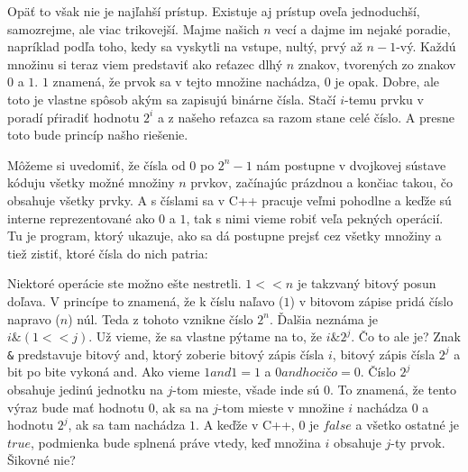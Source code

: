 
Opäť to však nie je najľahší prístup. Existuje aj prístup oveľa jednoduchší, samozrejme, ale viac
trikovejší. Majme našich $n$ vecí a dajme im nejaké poradie, napríklad podľa toho, kedy sa
vyskytli na vstupe, nultý, prvý až $n-1$-vý. Každú množinu si teraz viem predstaviť ako reťazec dlhý
$n$ znakov, tvorených zo znakov $0$ a $1$. $1$ znamená, že prvok sa v tejto množine nachádza, $0$ je
opak. Dobre, ale toto je vlastne spôsob akým sa zapisujú binárne čísla. Stačí $i$-temu prvku v
poradí pŕiradiť hodnotu $2^i$ a z našeho reťazca sa razom stane celé číslo. A presne toto bude
princíp našho riešenie.

Môžeme si uvedomiť, že čísla od $0$ po $2^n-1$ nám postupne v dvojkovej sústave kóduju všetky možné
množiny $n$ prvkov, začínajúc prázdnou a končiac takou, čo obsahuje všetky prvky. A s číslami sa v
C++ pracuje veľmi pohodlne a keďže sú interne reprezentované ako $0$ a $1$, tak s nimi vieme robiť
veľa pekných operácií. Tu je program, ktorý ukazuje, ako sa dá postupne prejsť cez všetky množiny a
tiež zistiť, ktoré čísla do nich patria:


Niektoré operácie ste možno ešte nestretli. \texttt{$1<<n$} je takzvaný bitový posun doľava. V
princípe to znamená, že k číslu naľavo ($1$) v bitovom zápise pridá číslo napravo ($n$) núl. Teda z
tohoto vznikne číslo $2^n$. Ďalšia neznáma je \texttt{$i\&(1<<j)$}. Už vieme, že sa vlastne pýtame na
to, že $i\&2^j$. Čo to ale je? Znak \verb'&' predstavuje bitový and, ktorý zoberie bitový zápis čísla
$i$, bitový zápis čísla $2^j$ a bit po bite vykoná and. Ako vieme $1 and 1 = 1$ a $0 and hocičo =
0$. Číslo $2^j$ obsahuje jedinú jednotku na $j$-tom mieste, všade inde sú $0$. To znamená, že tento
výraz bude mať hodnotu $0$, ak sa na $j$-tom mieste v množine $i$ nachádza $0$ a hodnotu $2^j$, ak
sa tam nachádza $1$. A keďže v C++, $0$ je $false$ a všetko ostatné je $true$, podmienka bude
splnená práve vtedy, keď množina $i$ obsahuje $j$-ty prvok. Šikovné nie?


